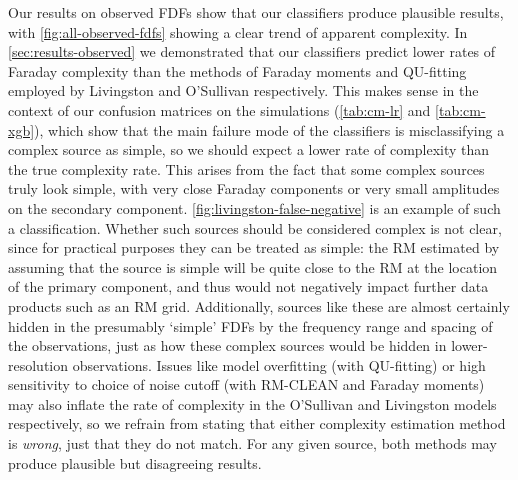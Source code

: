   Our results on observed FDFs show that our classifiers produce plausible results, with \autoref{fig:all-observed-fdfs} showing a clear trend of apparent complexity. In \autoref{sec:results-observed} we demonstrated that our classifiers predict lower rates of Faraday complexity than the methods of Faraday moments and QU-fitting employed by Livingston and O'Sullivan respectively. This makes sense in the context of our confusion matrices on the simulations (\autoref{tab:cm-lr} and \autoref{tab:cm-xgb}), which show that the main failure mode of the classifiers is misclassifying a complex source as simple, so we should expect a lower rate of complexity than the true complexity rate. This arises from the fact that some complex sources truly look simple, with very close Faraday components or very small amplitudes on the secondary component. \autoref{fig:livingston-false-negative} is an example of such a classification. Whether such sources should be considered complex is not clear, since for practical purposes they can be treated as simple: the RM estimated by assuming that the source is simple will be quite close to the RM at the location of the primary component, and thus would not negatively impact further data products such as an RM grid. Additionally, sources like these are almost certainly hidden in the presumably `simple' FDFs by the frequency range and spacing of the observations, just as how these complex sources would be hidden in lower-resolution observations. Issues like model overfitting (with QU-fitting) or high sensitivity to choice of noise cutoff (with RM-CLEAN and Faraday moments) may also inflate the rate of complexity in the O'Sullivan and Livingston models respectively, so we refrain from stating that either complexity estimation method is \emph{wrong}, just that they do not match. For any given source, both methods may produce plausible but disagreeing results.

